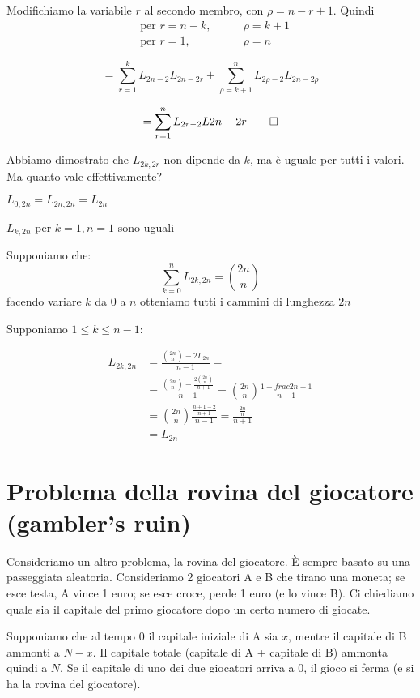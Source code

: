 \documentclass[a4paper,12pt]{book}
\begin{document}

Modifichiamo la variabile $ r $ al secondo membro, con $ \rho = n -r + 1 $. Quindi 
\begin{align*}
	& \text{per } r = n - k, & \qquad \rho = k + 1 \\
	& \text{per } r = 1, & \qquad \rho = n
\end{align*}

$$ = \sum_{r=1}^{k}L_{2n-2}L_{2n-2r} + \sum_{\rho = k+1}^{n} L_{2\rho - 2} L_{2n - 2\rho}$$

$$ = \sum_{r=1}^{n} L_{2r-2}L{2n-2r} \qed$$

Abbiamo dimostrato che $ L_{2k,2r} $ non dipende da $ k $, ma è uguale per tutti i valori. Ma quanto vale effettivamente?

$ L_{0, 2n} = L_{2n,2n} = L_{2n} $

$ L_{k,2n} $ per $ k = 1, n = 1 $ sono uguali

Supponiamo che: 
$$ \sum_{k=0}^{n} L_{2k,2n} = \binom{2n}{n} $$
facendo variare $ k $ da 0 a $ n $ otteniamo tutti i cammini di lunghezza $ 2n $

Supponiamo $ 1 \le k \le n-1 $:

\begin{align*}
	L_{2k, 2n} & = \frac{\binom{2n}{n} - 2L_{2n}}{n-1} = \\
	& = \frac{\binom{2n}{n} - \frac{2\binom{2n}{n}}{n+1}}{n-1} = \binom{2n}{n} \frac{1 - frac{2}{n+1}}{n-1} \\
	& = \binom{2n}{n}\frac{\frac{n+1-2}{n+1}}{n-1} = \frac{\frac{2n}{n}}{n+1} \\
	& = L_{2n}
\end{align*}

\section{Problema della rovina del giocatore (gambler's ruin)}
Consideriamo un altro problema, la rovina del giocatore. È sempre basato su una passeggiata aleatoria. Consideriamo 2 giocatori A e B che tirano una moneta; se esce testa, A vince 1 euro; se esce croce, perde 1 euro (e lo vince B). Ci chiediamo quale sia il capitale del primo giocatore dopo un certo numero di giocate. 

Supponiamo che al tempo 0 il capitale iniziale di A sia $ x $, mentre il capitale di B ammonti a $ N - x $. Il capitale totale (capitale di A + capitale di B) ammonta quindi a $ N $. Se il capitale di uno dei due giocatori arriva a 0, il gioco si ferma (e si ha la rovina del giocatore). 
\end{document}
